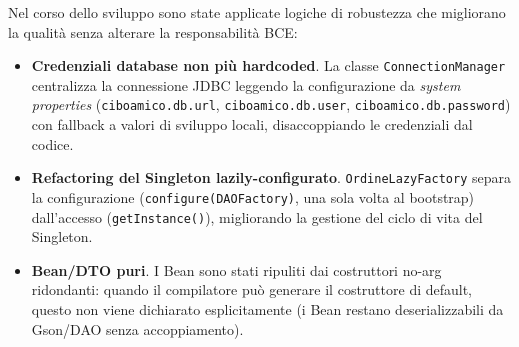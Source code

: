 Nel corso dello sviluppo sono state applicate logiche di robustezza che
migliorano la qualità senza alterare la responsabilità BCE:

\begin{itemize}
    \item \textbf{Credenziali database non più hardcoded}. La classe
    \texttt{ConnectionManager} centralizza la connessione JDBC leggendo la
    configurazione da \emph{system properties}
    (\texttt{ciboamico.db.url}, \texttt{ciboamico.db.user},
    \texttt{ciboamico.db.password}) con fallback a valori di sviluppo locali,
    disaccoppiando le credenziali dal codice.
    \item \textbf{Refactoring del Singleton lazily-configurato}.
    \texttt{OrdineLazyFactory} separa la configurazione (\texttt{configure(DAOFactory)},
    una sola volta al bootstrap) dall'accesso (\texttt{getInstance()}),
    migliorando la gestione del ciclo di vita del Singleton.
    \item \textbf{Bean/DTO puri}. I Bean sono stati ripuliti dai costruttori
    no-arg ridondanti: quando il compilatore può generare il costruttore di
    default, questo non viene dichiarato esplicitamente (i Bean restano
    deserializzabili da Gson/DAO senza accoppiamento).
\end{itemize}
